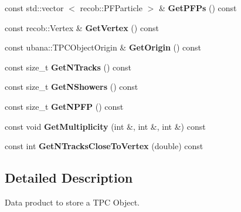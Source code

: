 \begin{DoxyCompactItemize}
\item 
\hypertarget{classubana_1_1TPCObject_a98af6b4a96031938afd18c372cd9d6d6}{const std\-::vector\*
$<$ recob\-::\-P\-F\-Particle $>$ \& {\bfseries \-Get\-P\-F\-Ps} () const }\label{classubana_1_1TPCObject_a98af6b4a96031938afd18c372cd9d6d6}

\item 
\hypertarget{classubana_1_1TPCObject_a3845ae1b31ab6590c5597d157dc01e6a}{const recob\-::\-Vertex \& {\bfseries \-Get\-Vertex} () const }\label{classubana_1_1TPCObject_a3845ae1b31ab6590c5597d157dc01e6a}

\item 
\hypertarget{classubana_1_1TPCObject_a253b4e844b4de1333fa80263c03fceb7}{const ubana\-::\-T\-P\-C\-Object\-Origin \& {\bfseries \-Get\-Origin} () const }\label{classubana_1_1TPCObject_a253b4e844b4de1333fa80263c03fceb7}

\item 
\hypertarget{classubana_1_1TPCObject_af083d0e6577c431c1787eb46d313110b}{const size\-\_\-t {\bfseries \-Get\-N\-Tracks} () const }\label{classubana_1_1TPCObject_af083d0e6577c431c1787eb46d313110b}

\item 
\hypertarget{classubana_1_1TPCObject_a988b385655d32acd03121089058d49c4}{const size\-\_\-t {\bfseries \-Get\-N\-Showers} () const }\label{classubana_1_1TPCObject_a988b385655d32acd03121089058d49c4}

\item 
\hypertarget{classubana_1_1TPCObject_a5ec2d5ffe50fe31e05d5d1c4fd486df6}{const size\-\_\-t {\bfseries \-Get\-N\-P\-F\-P} () const }\label{classubana_1_1TPCObject_a5ec2d5ffe50fe31e05d5d1c4fd486df6}

\item 
\hypertarget{classubana_1_1TPCObject_a7c83c2331680f657d7fdcee1298e541b}{const void {\bfseries \-Get\-Multiplicity} (int \&, int \&, int \&) const }\label{classubana_1_1TPCObject_a7c83c2331680f657d7fdcee1298e541b}

\item 
\hypertarget{classubana_1_1TPCObject_aad6393ccb8f6b6e4ba6f36f790729c0b}{const int {\bfseries \-Get\-N\-Tracks\-Close\-To\-Vertex} (double) const }\label{classubana_1_1TPCObject_aad6393ccb8f6b6e4ba6f36f790729c0b}

\end{DoxyCompactItemize}


\subsection{\-Detailed \-Description}
\-Data product to store a \-T\-P\-C \-Object. 


